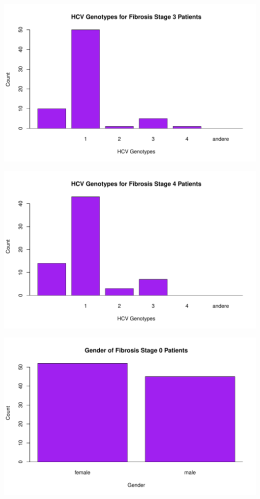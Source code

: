 \documentclass{article}
\begin{document}
\includegraphics{HW0-028}

\includegraphics{HW0-029}

\includegraphics{HW0-030}
\end{document}
